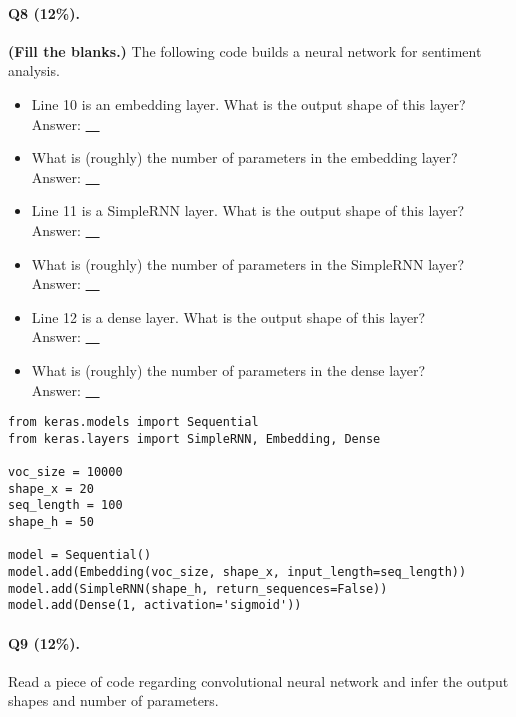 \documentclass[11pt]{article}
\numberwithin{equation}{section}
\begin{document}
\paragraph{Q8 (12\%).} 
{\bf (Fill the blanks.)}
The following code builds a neural network for sentiment analysis.
\begin{itemize}
	\item 
	Line 10 is an embedding layer. 
	What is the output shape of this layer?\\
	Answer: \underline{~\qquad\qquad\qquad~}
	\item 
	What is (roughly) the number of parameters in the embedding layer?\\
	Answer: \underline{~\qquad\qquad\qquad~}
	\item 
	Line 11 is a SimpleRNN layer. 
	What is the output shape of this layer?\\
	Answer: \underline{~\qquad\qquad\qquad~}
	\item 
	What is (roughly) the number of parameters in the SimpleRNN layer?\\
	Answer: \underline{~\qquad\qquad\qquad~}
	\item 
	Line 12 is a dense layer. 
	What is the output shape of this layer?\\
	Answer: \underline{~\qquad\qquad\qquad~}
	\item 
	What is (roughly) the number of parameters in the dense layer?\\
	Answer: \underline{~\qquad\qquad\qquad~}
\end{itemize}



\begin{lstlisting}
from keras.models import Sequential
from keras.layers import SimpleRNN, Embedding, Dense

voc_size = 10000 
shape_x = 20 
seq_length = 100 
shape_h = 50

model = Sequential()
model.add(Embedding(voc_size, shape_x, input_length=seq_length)) 
model.add(SimpleRNN(shape_h, return_sequences=False))
model.add(Dense(1, activation='sigmoid'))
\end{lstlisting}
\vspace{3mm}




\paragraph{Q9 (12\%).} 
Read a piece of code regarding convolutional neural network and infer the output shapes and number of parameters.
\end{document}
